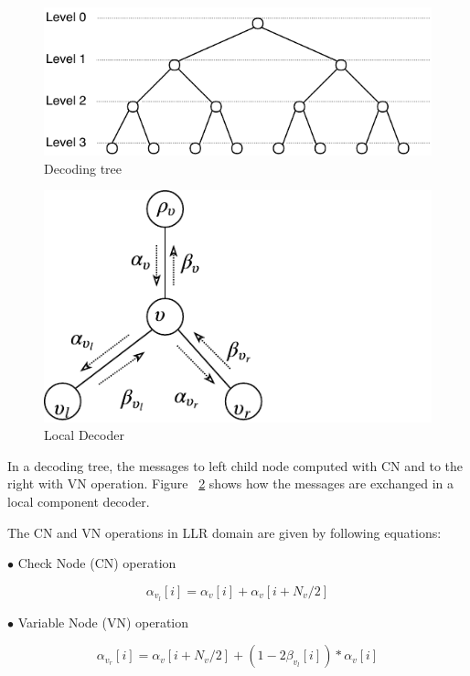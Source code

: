 \begin{figure}[h]
	\centering
	\includegraphics{./figures/decodingTree.pdf}
	\caption{Decoding tree}
	\label{fig:decodingTree}
\end{figure}

\begin{figure}[h]
	\centering
	\includegraphics{./figures/messagePassingDiaS.pdf}
	\caption{Local Decoder}
	\label{fig:msgPassingDia}
\end{figure}

In a decoding  tree, the messages to left child node computed with CN and to the right with VN operation.  Figure ~\ref{fig:msgPassingDia} shows how the messages are exchanged in a local component decoder.

The CN and VN operations in LLR domain are given by following equations:

$\bullet$ Check Node (CN) operation

\begin{equation} \label{cnop}
	\alpha_{v_{l}}[i] = \alpha_{v}[i] + \alpha_{v}[i + N_{v}/2]
\end{equation}

$\bullet$ Variable Node (VN) operation

\begin{equation} \label{vnop}
\alpha_{v_{r}}[i] = \alpha_{v}[i + N_{v}/2] + (1 - 2\beta_{v_{l}}[i]) * \alpha_{v}[i]
\end{equation}

